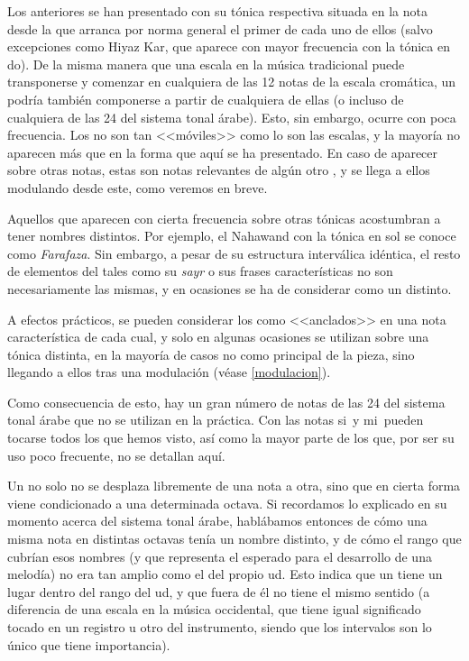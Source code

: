 Los anteriores \maqamaat se han presentado con su tónica respectiva situada en la nota desde la que arranca por norma general el primer \yins de cada uno de ellos (salvo excepciones como Hiyaz Kar, que aparece con mayor frecuencia con la tónica en do). De la misma manera que una escala en la música tradicional puede transponerse y comenzar en cualquiera de las 12 notas de la escala cromática, un \maqam podría también componerse a partir de cualquiera de ellas (o incluso de cualquiera de las 24 del sistema tonal árabe). Esto, sin embargo, ocurre con poca frecuencia. Los \maqamaat no son tan <<móviles>> como lo son las escalas, y la mayoría no aparecen más que en la forma que aquí se ha presentado. En caso de aparecer sobre otras notas, estas son notas relevantes de algún otro \maqamb, y se llega a ellos modulando desde este, como veremos en breve.

Aquellos \maqamaat que aparecen con cierta frecuencia sobre otras tónicas acostumbran a tener nombres distintos. Por ejemplo, el \maqam Nahawand con la tónica en sol se conoce como \emph{Farafaza}. Sin embargo, a pesar de su estructura interválica idéntica, el resto de elementos del \maqam tales como su \emph{sayr} o sus frases características no son necesariamente las mismas, y en ocasiones se ha de considerar como un \maqam distinto.

A efectos prácticos, se pueden considerar los \maqamaat como <<anclados>> en una nota característica de cada cual, y solo en algunas ocasiones se utilizan sobre una tónica distinta, en la mayoría de casos no como \maqam principal de la pieza, sino llegando a ellos tras una modulación (véase \ref{modulacion}).

Como consecuencia de esto, hay un gran número de notas de las 24 del sistema tonal árabe que no se utilizan en la práctica. Con las notas si\hflat\ y mi\hflat\ pueden tocarse todos los \maqamaat que hemos visto, así como la mayor parte de los que, por ser su uso poco frecuente, no se detallan aquí.

Un \maqam no solo no se desplaza libremente de una nota a otra, sino que en cierta forma viene condicionado a una determinada octava. Si recordamos lo explicado en su momento acerca del sistema tonal árabe, hablábamos entonces de cómo una misma nota en distintas octavas tenía un nombre distinto, y de cómo el rango que cubrían esos nombres (y que representa el esperado para el desarrollo de una melodía) no era tan amplio como el del propio ud. Esto indica que un \maqam tiene un lugar dentro del rango del ud, y que fuera de él no tiene el mismo sentido (a diferencia de una escala en la música occidental, que tiene igual significado tocado en un registro u otro del instrumento, siendo que los intervalos son lo único que tiene importancia).

